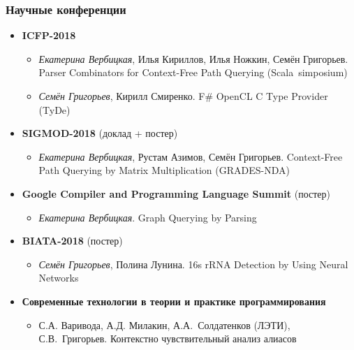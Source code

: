 \documentclass[xcolor=table]{beamer}
\begin{document}
\begin{frame}[fragile]
  \transwipe[direction=90]
  \frametitle{Научные конференции}
\begin{itemize}

      \item \textbf{ICFP-2018}
      \begin{itemize}
        \item \emph{Екатерина Вербицкая}, Илья Кириллов, Илья Ножкин, Семён Григорьев. Parser Combinators for Context-Free Path Querying (Scala~simposium)
        \item \emph{Семён Григорьев}, Кирилл Смиренко. F\# OpenCL C Type Provider (TyDe)
      \end{itemize}

      \item \textbf{SIGMOD-2018} (доклад + постер)
      \begin{itemize}
        \item \emph{Екатерина Вербицкая}, Рустам Азимов, Семён Григорьев. Context-Free Path Querying by Matrix Multiplication (GRADES-NDA)
      \end{itemize}
      
      \item \textbf{Google Compiler and Programming Language Summit} (постер)
      \begin{itemize}
        \item \emph{Екатерина Вербицкая}. Graph Querying by Parsing 
      \end{itemize}

      \item \textbf{BIATA-2018} (постер)
      \begin{itemize}
         \item \emph{Семён Григорьев}, Полина Лунина. 16s rRNA Detection by Using Neural Networks 
      \end{itemize}
      
      \item \textbf{Современные технологии в теории и практике программирования}
      \begin{itemize}
         \item С.А. Варивода, А.Д. Милакин, А.А.~Солдатенков (ЛЭТИ), С.В.~Григорьев. Контекстно чувствительный анализ алиасов
      \end{itemize}

\end{itemize}
\end{frame}
 
\end{document}
